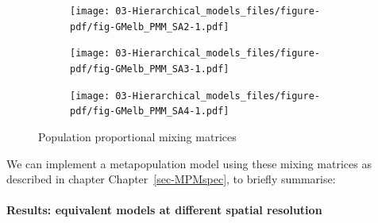 \documentclass[
  letterpaper,
  DIV=11,
  numbers=noendperiod]{scrreprt}
\let\oldparagraph\paragraph
\renewcommand{\paragraph}[1]{\oldparagraph{#1}\mbox{}}
\begin{document}
\begin{figure}

\begin{minipage}[t]{0.50\linewidth}

{\centering 

\begin{figure}

{\centering \texttt{[image: 03-Hierarchical\_models\_files/figure-pdf/fig-GMelb\_PMM\_SA2-1.pdf]}

}

\end{figure}

}

\end{minipage}%
%
\begin{minipage}[t]{0.50\linewidth}

{\centering 

\begin{figure}

{\centering \texttt{[image: 03-Hierarchical\_models\_files/figure-pdf/fig-GMelb\_PMM\_SA3-1.pdf]}

}

\end{figure}

}

\end{minipage}%
\newline
\begin{minipage}[t]{0.50\linewidth}

{\centering 

\begin{figure}

{\centering \texttt{[image: 03-Hierarchical\_models\_files/figure-pdf/fig-GMelb\_PMM\_SA4-1.pdf]}

}

\end{figure}

}

\end{minipage}%

\caption{\label{fig-GMGCC_PMM}Population proportional mixing matrices}

\end{figure}

We can implement a metapopulation model using these mixing matrices as
described in chapter Chapter~\ref{sec-MPMspec}, to briefly summarise:

\hypertarget{results-equivalent-models-at-different-spatial-resolution}{%
\paragraph{Results: equivalent models at different spatial
resolution}\label{results-equivalent-models-at-different-spatial-resolution}}
\end{document}
